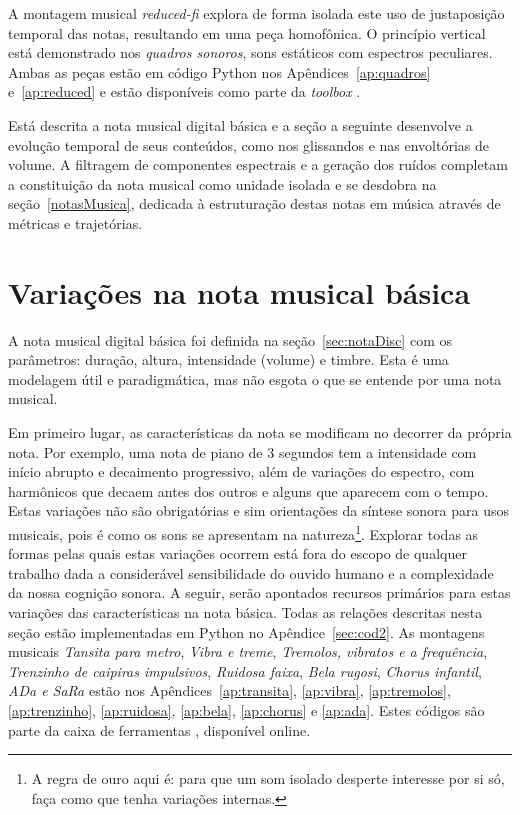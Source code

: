 A montagem musical \emph{reduced-fi} explora de forma isolada este uso de justaposição temporal das notas, resultando em uma peça homofônica. O princípio vertical está demonstrado nos \emph{quadros sonoros}, sons estáticos com espectros peculiares. Ambas as peças estão em código Python nos Apêndices~\ref{ap:quadros} e~\ref{ap:reduced} e estão disponíveis como parte da \emph{toolbox} \massa.\cite{MASSA}

Está descrita a nota musical digital básica e a seção a seguinte desenvolve a evolução temporal de seus conteúdos, como nos glissandos e nas envoltórias de volume. A filtragem de componentes espectrais e a geração dos ruídos completam a constituição da nota musical como unidade isolada e se desdobra na seção~\ref{notasMusica}, dedicada à estruturação destas notas em música através de métricas e trajetórias.




\afterpage{\blankpage}
\clearpage

\section{Variações na nota musical básica}\label{varInternas}

A nota musical digital básica foi definida na seção~\ref{sec:notaDisc} com os parâmetros:
duração, altura, intensidade (volume) e timbre. Esta é uma modelagem
útil e paradigmática, mas não esgota o que se entende por
uma nota musical.

Em primeiro lugar, as características da nota se modificam no decorrer
da própria nota.\cite{Chowning} Por exemplo, uma nota de piano
de 3 segundos tem a intensidade com início abrupto e decaimento progressivo,
além de variações do espectro, com harmônicos que
decaem antes dos outros e alguns que aparecem com o tempo.
Estas variações não são obrigatórias e sim orientações da
síntese sonora para usos musicais, pois é como os sons
se apresentam na natureza\footnote{A regra de ouro
aqui é: para que um som isolado desperte interesse
por si só, faça como que tenha variações internas.\cite{Roederer}}. 
Explorar todas as formas pelas quais estas variações ocorrem está fora
do escopo de qualquer trabalho dada a considerável sensibilidade do ouvido humano
e a complexidade da nossa cognição sonora. A seguir, serão apontados
recursos primários para estas variações das características na nota
básica.
Todas as relações descritas nesta seção estão implementadas em Python no Apêndice~\ref{sec:cod2}. As montagens musicais \emph{Tansita para metro}, \emph{Vibra e treme}, \emph{Tremolos, vibratos e a frequência}, \emph{Trenzinho de caipiras impulsivos}, \emph{Ruidosa faixa}, \emph{Bela rugosi}, \emph{Chorus infantil}, \emph{ADa e SaRa} estão nos Apêndices~\ref{ap:transita}, \ref{ap:vibra}, \ref{ap:tremolos}, \ref{ap:trenzinho}, \ref{ap:ruidosa}, \ref{ap:bela}, \ref{ap:chorus} e \ref{ap:ada}. Estes códigos são parte da caixa de ferramentas \massa, disponível online.\cite{MASSA}



